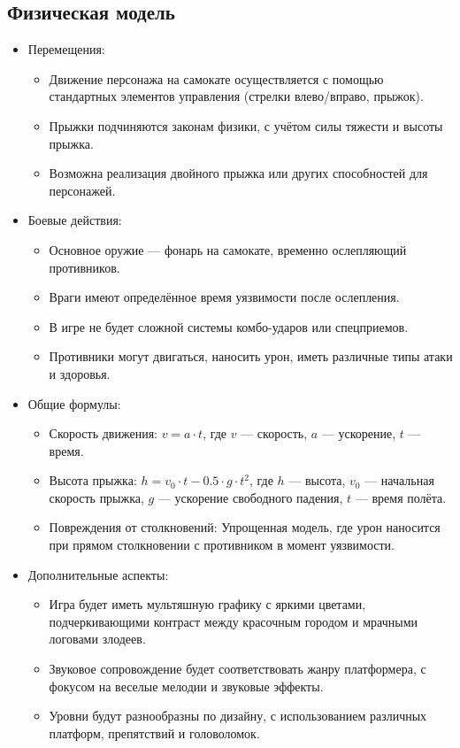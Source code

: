\documentclass[article,12pt, fleqn]{article}
\begin{document}
\begin{itemize}
\subsection{Физическая модель}
\begin{itemize}
    \item Перемещения: 
    \begin{itemize}
        \item Движение персонажа на самокате осуществляется с помощью стандартных элементов управления (стрелки влево/вправо, прыжок). 
        \item Прыжки подчиняются законам физики, с учётом силы тяжести и высоты прыжка. 
        \item Возможна реализация двойного прыжка или других способностей для персонажей. 
        \end{itemize}
    \item Боевые действия:
    \begin{itemize}
        \item Основное оружие — фонарь на самокате, временно ослепляющий противников. 
        \item Враги имеют определённое время уязвимости после ослепления. 
        \item В игре не будет сложной системы комбо-ударов или спецприемов. 
        \item Противники могут двигаться, наносить урон, иметь различные типы атаки и здоровья. 
    \end{itemize}
    \item Общие формулы:
    \begin{itemize}
        \item Скорость движения: $v = a\cdot t$, где $v$ --- скорость, $a$ --- ускорение, $t$ --- время. 
        \item Высота прыжка: $h = v_0 \cdot t - 0.5\cdot g\cdot t^2$, где $h$ --- высота, $v_0$ --- начальная скорость прыжка, $g$ --- ускорение свободного падения, $t$ --- время полёта.
        \item Повреждения от столкновений: Упрощенная модель, где урон наносится при прямом столкновении с противником в момент уязвимости.
    \end{itemize}
    \item Дополнительные аспекты: 
    \begin{itemize}
        \item Игра будет иметь мультяшную графику с яркими цветами, подчеркивающими контраст между красочным городом и мрачными логовами злодеев. 
        \item Звуковое сопровождение будет соответствовать жанру платформера, с фокусом на веселые мелодии и звуковые эффекты. 
        \item Уровни будут разнообразны по дизайну, с использованием различных платформ, препятствий и головоломок.
    \end{itemize}
\end{itemize}


\end{itemize}
\end{document}
